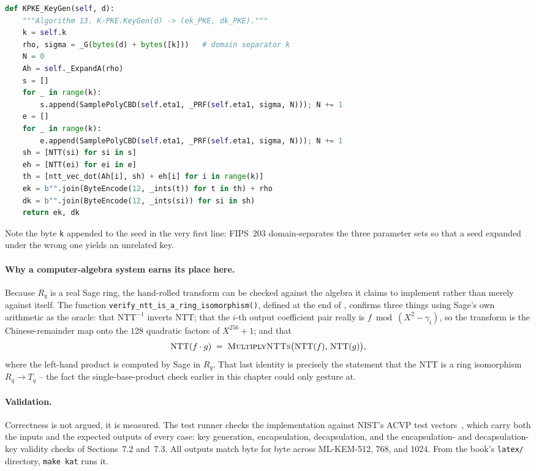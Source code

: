 \begin{lstlisting}[language=Python]
def KPKE_KeyGen(self, d):
    """Algorithm 13. K-PKE.KeyGen(d) -> (ek_PKE, dk_PKE)."""
    k = self.k
    rho, sigma = _G(bytes(d) + bytes([k]))   # domain separator k
    N = 0
    Ah = self._ExpandA(rho)
    s = []
    for _ in range(k):
        s.append(SamplePolyCBD(self.eta1, _PRF(self.eta1, sigma, N))); N += 1
    e = []
    for _ in range(k):
        e.append(SamplePolyCBD(self.eta1, _PRF(self.eta1, sigma, N))); N += 1
    sh = [NTT(si) for si in s]
    eh = [NTT(ei) for ei in e]
    th = [ntt_vec_dot(Ah[i], sh) + eh[i] for i in range(k)]
    ek = b"".join(ByteEncode(12, _ints(t)) for t in th) + rho
    dk = b"".join(ByteEncode(12, _ints(si)) for si in sh)
    return ek, dk
\end{lstlisting}

Note the byte \texttt{k} appended to the seed in the very first line: FIPS~203
domain-separates the three parameter sets so that a seed expanded under the
wrong one yields an unrelated key.

\paragraph{Why a computer-algebra system earns its place here.}
Because $R_q$ is a real Sage ring, the hand-rolled transform can be checked
against the algebra it claims to implement rather than merely against itself.
The function \texttt{verify\_ntt\_is\_a\_ring\_isomorphism()}, defined at the
end of , confirms three
things using Sage's own arithmetic as the oracle: that $\mathrm{NTT}^{-1}$
inverts $\mathrm{NTT}$; that the $i$-th output coefficient pair really is
$f \bmod (X^2-\gamma_i)$, so the transform is the Chinese-remainder map onto
the $128$ quadratic factors of $X^{256}+1$; and that
\[
\mathrm{NTT}(f\cdot g) \;=\; \textsc{MultiplyNTTs}\big(\mathrm{NTT}(f),\,\mathrm{NTT}(g)\big),
\]
where the left-hand product is computed by Sage in $R_q$. That last identity
is precisely the statement that the NTT is a ring isomorphism $R_q \to T_q$ --
the fact the single-base-product check earlier in this chapter could only
gesture at.

\paragraph{Validation.}
Correctness is not argued, it is measured. The test runner
 checks the implementation against NIST's ACVP
test vectors~\cite{acvp}, which carry both the inputs and the expected outputs of every
case: key generation, encapsulation, decapsulation, and the encapsulation-
and decapsulation-key validity checks of Sections~7.2 and~7.3. All outputs
match byte for byte across ML-KEM-512, 768, and 1024. From the book's
\texttt{latex/} directory, \texttt{make kat} runs it.


